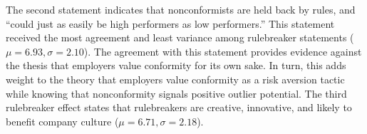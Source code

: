 The second statement indicates that nonconformists are held back by rules,
and ``could just as easily be high performers as low performers.''
This statement received the most agreement and least variance among rulebreaker statements ($\mu = 6.93, \sigma = 2.10$).
The agreement with this statement provides evidence against the thesis that employers value conformity for its own sake.
In turn, this adds weight to the theory that employers value conformity as a risk aversion tactic while knowing that nonconformity signals positive outlier potential.
The third rulebreaker effect states that rulebreakers are creative, innovative, and likely to benefit company culture ($\mu = 6.71, \sigma = 2.18$).


